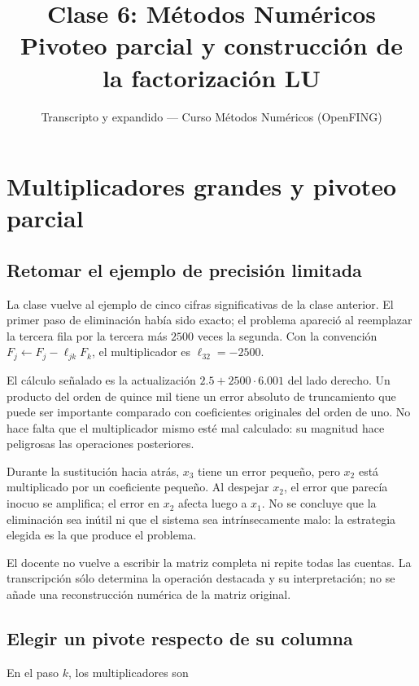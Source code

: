 \documentclass[12pt,a4paper]{article}
\title{\textbf{Clase 6: Métodos Numéricos} \\[0.3em]
        \large{Pivoteo parcial y construcción de la factorización LU}}
\author{Transcripto y expandido --- Curso Métodos Numéricos (OpenFING)}
\date{}
\begin{document}
\maketitle
\thispagestyle{empty}
\newpage
\tableofcontents
\newpage

\section{Multiplicadores grandes y pivoteo parcial}

\subsection{Retomar el ejemplo de precisión limitada}

La clase vuelve al ejemplo de cinco cifras significativas de la clase anterior. El primer paso de eliminación había sido exacto; el problema apareció al reemplazar la tercera fila por la tercera más $2500$ veces la segunda. Con la convención $F_j\leftarrow F_j-\ell_{jk}F_k$, el multiplicador es $\ell_{32}=-2500$.

El cálculo señalado es la actualización $2.5+2500\cdot6.001$ del lado derecho. Un producto del orden de quince mil tiene un error absoluto de truncamiento que puede ser importante comparado con coeficientes originales del orden de uno. No hace falta que el multiplicador mismo esté mal calculado: su magnitud hace peligrosas las operaciones posteriores.

Durante la sustitución hacia atrás, $x_3$ tiene un error pequeño, pero $x_2$ está multiplicado por un coeficiente pequeño. Al despejar $x_2$, el error que parecía inocuo se amplifica; el error en $x_2$ afecta luego a $x_1$. No se concluye que la eliminación sea inútil ni que el sistema sea intrínsecamente malo: la estrategia elegida es la que produce el problema.

\begin{notebox}
El docente no vuelve a escribir la matriz completa ni repite todas las cuentas. La transcripción sólo determina la operación destacada y su interpretación; no se añade una reconstrucción numérica de la matriz original.
\end{notebox}

\subsection{Elegir un pivote respecto de su columna}

En el paso $k$, los multiplicadores son
\end{document}
